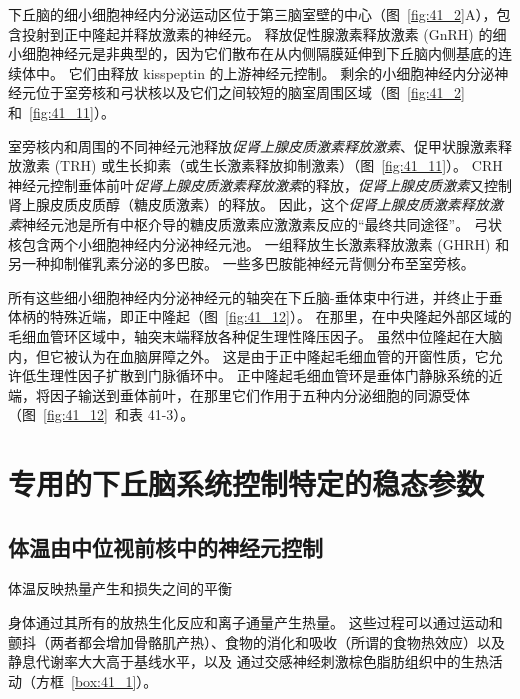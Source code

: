 下丘脑的细小细胞神经内分泌运动区位于第三脑室壁的中心（图~\ref{fig:41_2}A），包含投射到正中隆起并释放激素的神经元。
释放促性腺激素释放激素 (GnRH) 的细小细胞神经元是非典型的，因为它们散布在从内侧隔膜延伸到下丘脑内侧基底的连续体中。
它们由释放 kisspeptin 的上游神经元控制。
剩余的小细胞神经内分泌神经元位于室旁核和弓状核以及它们之间较短的脑室周围区域（图~\ref{fig:41_2} 和~\ref{fig:41_11}）。


室旁核内和周围的不同神经元池释放\textit{促肾上腺皮质激素释放激素}、促甲状腺激素释放激素 (TRH) 或生长抑素（或生长激素释放抑制激素）（图~\ref{fig:41_11}）。
CRH 神经元控制垂体前叶\textit{促肾上腺皮质激素释放激素}的释放，\textit{促肾上腺皮质激素}又控制肾上腺皮质皮质醇（糖皮质激素）的释放。
因此，这个\textit{促肾上腺皮质激素释放激素}神经元池是所有中枢介导的糖皮质激素应激激素反应的“最终共同途径”。 弓状核包含两个小细胞神经内分泌神经元池。
一组释放生长激素释放激素 (GHRH) 和另一种抑制催乳素分泌的多巴胺。
一些多巴胺能神经元背侧分布至室旁核。


所有这些细小细胞神经内分泌神经元的轴突在下丘脑-垂体束中行进，并终止于垂体柄的特殊近端，即正中隆起（图~\ref{fig:41_12}）。
在那里，在中央隆起外部区域的毛细血管环区域中，轴突末端释放各种促生理性降压因子。
虽然中位隆起在大脑内，但它被认为在血脑屏障之外。
这是由于正中隆起毛细血管的开窗性质，它允许低生理性因子扩散到门脉循环中。
正中隆起毛细血管环是垂体门静脉系统的近端，将因子输送到垂体前叶，在那里它们作用于五种内分泌细胞的同源受体（图~\ref{fig:41_12}~和表 41-3）。



\section{专用的下丘脑系统控制特定的稳态参数}

\subsection{体温由中位视前核中的神经元控制}

体温反映热量产生和损失之间的平衡

身体通过其所有的放热生化反应和离子通量产生热量。
这些过程可以通过运动和颤抖（两者都会增加骨骼肌产热）、食物的消化和吸收（所谓的食物热效应）以及静息代谢率大大高于基线水平，以及 通过交感神经刺激棕色脂肪组织中的生热活动（方框~\ref{box:41_1}）。



